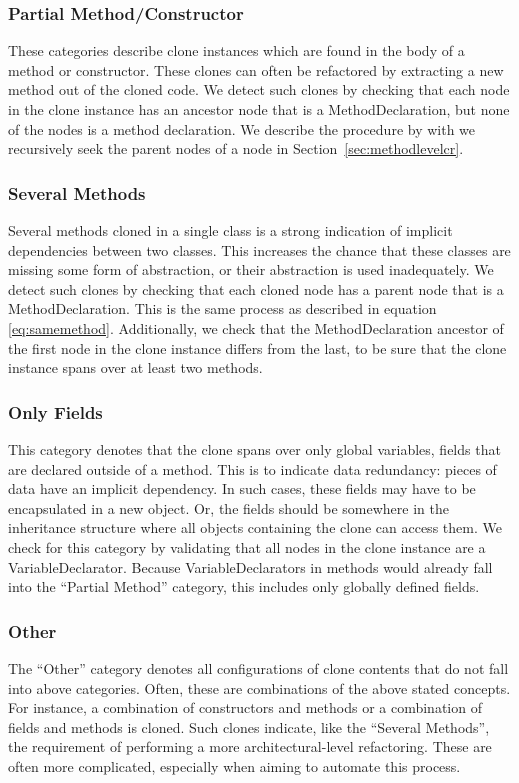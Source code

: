 \subsubsection{Partial Method/Constructor}
These categories describe clone instances which are found in the body of a method or constructor. These clones can often be refactored by extracting a new method out of the cloned code. We detect such clones by checking that each node in the clone instance has an ancestor node that is a MethodDeclaration, but none of the nodes is a method declaration. We describe the procedure by with we recursively seek the parent nodes of a node in Section~\ref{sec:methodlevelcr}.

\subsubsection{Several Methods}
Several methods cloned in a single class is a strong indication of implicit dependencies between two classes. This increases the chance that these classes are missing some form of abstraction, or their abstraction is used inadequately. We detect such clones by checking that each cloned node has a parent node that is a MethodDeclaration. This is the same process as described in equation \ref{eq:samemethod}. Additionally, we check that the MethodDeclaration ancestor of the first node in the clone instance differs from the last, to be sure that the clone instance spans over at least two methods.

\subsubsection{Only Fields}
This category denotes that the clone spans over only global variables, fields that are declared outside of a method. This is to indicate data redundancy: pieces of data have an implicit dependency. In such cases, these fields may have to be encapsulated in a new object. Or, the fields should be somewhere in the inheritance structure where all objects containing the clone can access them. We check for this category by validating that all nodes in the clone instance are a VariableDeclarator. Because VariableDeclarators in methods would already fall into the ``Partial Method'' category, this includes only globally defined fields.

\subsubsection{Other}
The ``Other'' category denotes all configurations of clone contents that do not fall into above categories. Often, these are combinations of the above stated concepts. For instance, a combination of constructors and methods or a combination of fields and methods is cloned. Such clones indicate, like the ``Several Methods'', the requirement of performing a more architectural-level refactoring. These are often more complicated, especially when aiming to automate this process.

